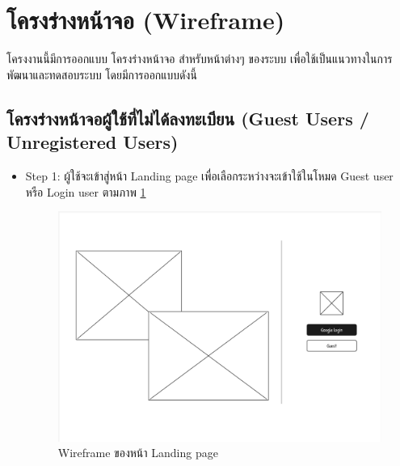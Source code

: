 \section{โครงร่างหน้าจอ (Wireframe)}
\begin{mypara}
    \indent โครงงานนี้มีการออกแบบ โครงร่างหน้าจอ สำหรับหน้าต่างๆ ของระบบ 
    เพื่อใช้เป็นแนวทางในการพัฒนาและทดสอบระบบ โดยมีการออกแบบดังนี้

\subsection{โครงร่างหน้าจอผู้ใช้ที่ไม่ได้ลงทะเบียน (Guest Users / Unregistered Users)}
\begin{itemize}
    \item Step 1: ผู้ใช้จะเข้าสู่หน้า Landing page เพื่อเลือกระหว่างจะเข้าใช้ในโหมด Guest user หรือ Login user 
    ตามภาพ \ref{fig:WireframeHomepage}
      \begin{figure}[H]
        \centering
        \includegraphics[scale=0.35]
        {homepage.png}
        \caption{Wireframe ของหน้า Landing page}
        \label{fig:WireframeHomepage}
      \end{figure}


\end{itemize}
\end{mypara}
